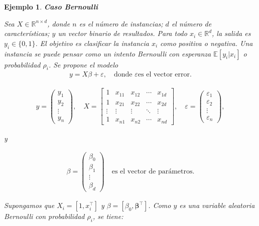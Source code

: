 \documentclass[12pt]{article}
\newtheorem{Ejem}{Ejemplo}%
\begin{document}
\begin{Ejem}\textbf{Caso Bernoulli}

Sea $X \in \mathbb{R}^{n \times d}$, donde $n$ es el  número de instancias; $d$ el  número de características; $y$ un vector binario de resultados. Para todo $x_i \in \mathbb{R}^d$, la salida es $y_i \in \{0,1\}$. El objetivo es clasificar la instancia $x_i$ como positiva o negativa. Una instancia se puede pensar como un intento Bernoulli con esperanza $\mathbb{E}[y_i | x_i]$ o probabilidad $\rho_i$. Se propone el modelo
\begin{eqnarray*}
y = X \beta + \varepsilon, \quad \text{donde }\varepsilon \text{es el vector error}.
\end{eqnarray*}

\begin{eqnarray*}
y = 
\begin{pmatrix}
y_1 \\
y_2 \\
\vdots \\
y_n
\end{pmatrix},
\quad
X = 
\begin{bmatrix}
1 & x_{11} & x_{12} & \cdots & x_{1d} \\
1 & x_{21} & x_{22} & \cdots & x_{2d} \\
\vdots & \vdots & \vdots & \ddots & \vdots \\
1 & x_{n1} & x_{n2} & \cdots & x_{nd}
\end{bmatrix},
\quad
\varepsilon = 
\begin{pmatrix}
\varepsilon_1 \\
\varepsilon_2 \\
\vdots \\
\varepsilon_n
\end{pmatrix},
\end{eqnarray*}

y

\begin{eqnarray*}
\beta = 
\begin{pmatrix}
\beta_0 \\
\beta_1 \\
\vdots \\
\beta_d
\end{pmatrix}
\quad \text{es el vector de parámetros.}
\end{eqnarray*}

Supongamos que $X_i = [1, x_i^\top]$ y $\beta = [\beta_0, \boldsymbol{\beta}^\top]$.  Como $y$ es una variable aleatoria Bernoulli con probabilidad $\rho_i$, se tiene:


\end{Ejem}
\end{document}
